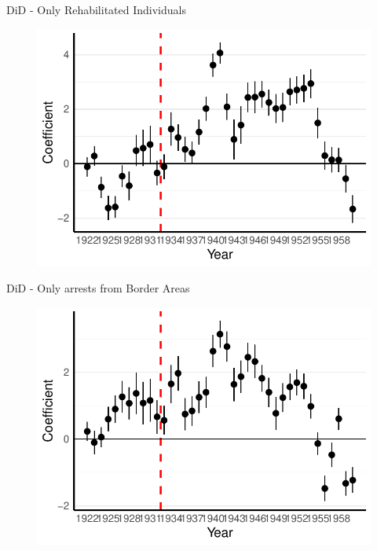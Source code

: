 \documentclass[11pt]{beamer}
\begin{document}
\begin{frame}[label=did_rehabs]{DiD - Only Rehabilitated Individuals}
 \begin{figure}[h]
\centering
\includegraphics[width=1\textwidth]{fmla_pred_full_imp_date_no_trends_geopol_rehab_cr2.pdf}
\end{figure}
\hyperlink{robustness_checks}{}
\end{frame}

\begin{frame}[label=did_border_area]{DiD - Only arrests from Border Areas}
 \begin{figure}[h]
\centering
\includegraphics[width=1\textwidth]{point_range_robust_cr2_border_provinces.pdf}
\end{figure}
\hyperlink{robustness_checks}{}
\end{frame}
\end{document}
